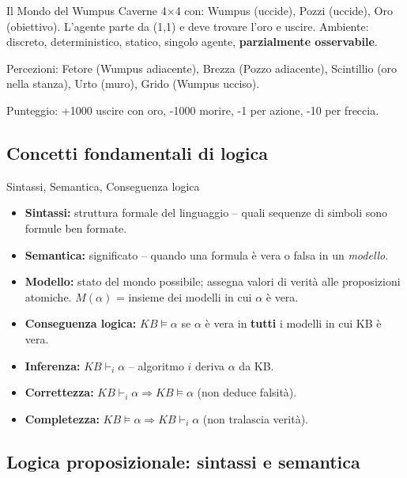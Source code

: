 \documentclass[12pt,a4paper]{article}
\begin{document}
\begin{esempiobox}{Il Mondo del Wumpus}
Caverne 4$\times$4 con: Wumpus (uccide), Pozzi (uccide), Oro (obiettivo). L'agente parte da (1,1) e deve trovare l'oro e uscire. Ambiente: discreto, deterministico, statico, singolo agente, \textbf{parzialmente osservabile}.

Percezioni: Fetore (Wumpus adiacente), Brezza (Pozzo adiacente), Scintillio (oro nella stanza), Urto (muro), Grido (Wumpus ucciso).

Punteggio: +1000 uscire con oro, -1000 morire, -1 per azione, -10 per freccia.
\end{esempiobox}

\subsection{Concetti fondamentali di logica}

\begin{defbox}{Sintassi{,} Semantica{,} Conseguenza logica}
\begin{itemize}[noitemsep]
  \item \textbf{Sintassi:} struttura formale del linguaggio -- quali sequenze di simboli sono formule ben formate.
  \item \textbf{Semantica:} significato -- quando una formula è vera o falsa in un \emph{modello}.
  \item \textbf{Modello:} stato del mondo possibile; assegna valori di verità alle proposizioni atomiche. $M(\alpha)$ = insieme dei modelli in cui $\alpha$ è vera.
  \item \textbf{Conseguenza logica:} $KB \models \alpha$ se $\alpha$ è vera in \textbf{tutti} i modelli in cui KB è vera.
  \item \textbf{Inferenza:} $KB \vdash_i \alpha$ -- algoritmo $i$ deriva $\alpha$ da KB.
  \item \textbf{Correttezza:} $KB \vdash_i \alpha \Rightarrow KB \models \alpha$ (non deduce falsità).
  \item \textbf{Completezza:} $KB \models \alpha \Rightarrow KB \vdash_i \alpha$ (non tralascia verità).
\end{itemize}
\end{defbox}

\subsection{Logica proposizionale: sintassi e semantica}
\end{document}
